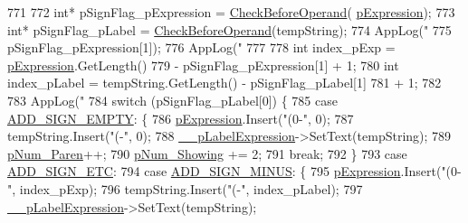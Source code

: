 \begin{DoxyCode}
771 
772                 \textcolor{keywordtype}{int}* pSignFlag\_pExpression = \hyperlink{class_calculator_form_ac322abae9350aee54dba283e68c94d5d}{CheckBeforeOperand}(
      \hyperlink{_calculator_form_8cpp_a8e641e0c730e6831fcb8e9caf57f5285}{pExpression});
773                 \textcolor{keywordtype}{int}* pSignFlag\_pLabel = \hyperlink{class_calculator_form_ac322abae9350aee54dba283e68c94d5d}{CheckBeforeOperand}(tempString);
774                 AppLog(\textcolor{stringliteral}{"%
775                         pSignFlag\_pExpression[1]);
776                 AppLog(\textcolor{stringliteral}{"%
777 
778                 \textcolor{keywordtype}{int} index\_pExp = \hyperlink{_calculator_form_8cpp_a8e641e0c730e6831fcb8e9caf57f5285}{pExpression}.GetLength()
779                         - pSignFlag\_pExpression[1] + 1;
780                 \textcolor{keywordtype}{int} index\_pLabel = tempString.GetLength() - pSignFlag\_pLabel[1]
781                         + 1;
782 
783                 AppLog(\textcolor{stringliteral}{"%
784                 \textcolor{keywordflow}{switch} (pSignFlag\_pLabel[0]) \{
785                 \textcolor{keywordflow}{case} \hyperlink{_calculator_form_8cpp_a4fc4627e993b733f1716e4f657fed196}{ADD\_SIGN\_EMPTY}: \{
786                     \hyperlink{_calculator_form_8cpp_a8e641e0c730e6831fcb8e9caf57f5285}{pExpression}.Insert(\textcolor{stringliteral}{"(0-"}, 0);
787                     tempString.Insert(\textcolor{stringliteral}{"(-"}, 0);
788                     \hyperlink{class_calculator_form_a85c791f34a8b69e7d22b7d64d7f69bac}{\_\_pLabelExpression}->SetText(tempString);
789                     \hyperlink{_calculator_form_8cpp_a5a03127e257bb5f5d935e038dcf8d834}{pNum\_Paren}++;
790                     \hyperlink{_calculator_form_8cpp_afab1dc0f42edf6d2d70e1a3b9a23114b}{pNum\_Showing} += 2;
791                     \textcolor{keywordflow}{break};
792                 \}
793                 \textcolor{keywordflow}{case} \hyperlink{_calculator_form_8cpp_aa80a5225e90cdfa081a9d871229028cd}{ADD\_SIGN\_ETC}:
794                 \textcolor{keywordflow}{case} \hyperlink{_calculator_form_8cpp_ab34236baa7c9cb7ea0b2c833a27683da}{ADD\_SIGN\_MINUS}: \{
795                     \hyperlink{_calculator_form_8cpp_a8e641e0c730e6831fcb8e9caf57f5285}{pExpression}.Insert(\textcolor{stringliteral}{"(0-"}, index\_pExp);
796                     tempString.Insert(\textcolor{stringliteral}{"(-"}, index\_pLabel);
797                     \hyperlink{class_calculator_form_a85c791f34a8b69e7d22b7d64d7f69bac}{\_\_pLabelExpression}->SetText(tempString);
}}}
\end{DoxyCode}
